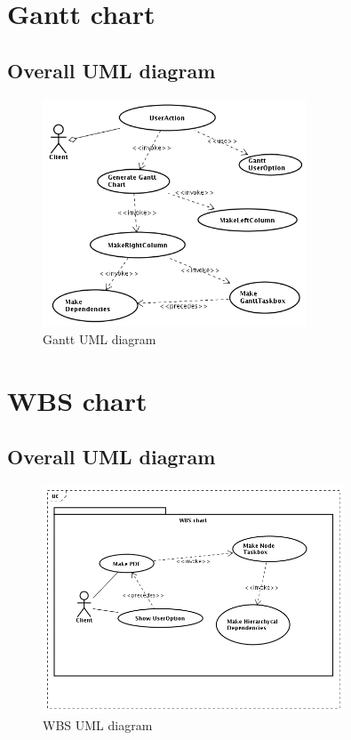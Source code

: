 \documentclass[a4paper, 12pt]{report}
\begin{document}
\chapter{Gantt chart}
\section*{Overall UML diagram}
\begin{figure}[h!] \centering
\includegraphics[width=0.7\textwidth]{Gantt/img/GanttChart.png} 
\caption{Gantt UML diagram}
\label{fig:ganttDiagram}
\end{figure}






\chapter{WBS chart}
\section*{Overall UML diagram}
\begin{figure}[h!] \centering
\includegraphics[width=0.8\textwidth]{WBS/WBSChart.png}
\caption{WBS UML diagram}
\label{fig:WBSdiagram}
\end{figure}



\end{document}
